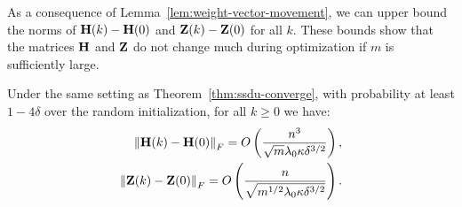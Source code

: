 As a consequence of Lemma~\ref{lem:weight-vector-movement}, we can upper bound the norms of $\mathbf{H}(k) - \mathbf{H}(0)$ and $\mathbf{Z}(k) - \mathbf{Z}(0)$ for all $k$.
These bounds show that the matrices $\mathbf{H}$ and $\mathbf{Z}$ do not change much during optimization if $m$ is sufficiently large.

\begin{lem} \label{lem:H-and-Z-perturbation}
	Under the same setting as Theorem~\ref{thm:ssdu-converge}, with probability at least $1-4\delta$ over the random initialization, for all $k\ge 0$ we have:
	\begin{equation*}
	\begin{aligned}
	\left\|\mathbf{H}(k) - \mathbf{H}(0)\right\|_F = O\left( \frac{n^3}{\sqrt m \lambda_0 \kappa \delta^{3/2}} \right), \\
	 \left\|\mathbf{Z}(k) - \mathbf{Z}(0)\right\|_F = O\left( \frac{n}{\sqrt{m^{1/2} \lambda_0 \kappa \delta^{3/2}}} \right).
	\end{aligned}
	\end{equation*}
\end{lem}

